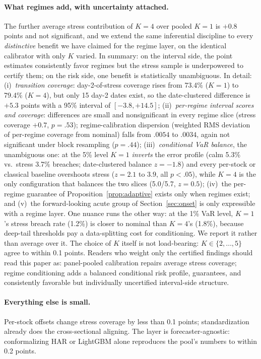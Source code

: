 \paragraph{What regimes add, with uncertainty attached.} The further
average stress contribution of $K = 4$ over pooled $K = 1$ is $+0.8$
points and not significant, and we extend the same inferential
discipline to every \emph{distinctive} benefit we have claimed for the
regime layer, on the identical calibrator with only $K$ varied. In
summary: on the interval side, the point estimates consistently
favor regimes but the stress sample is underpowered to certify them; on
the risk side, one benefit is statistically unambiguous. In detail:
(i)~\emph{transition coverage}: day-2-of-stress coverage rises from
73.4\% ($K = 1$) to 79.4\% ($K = 4$), but only 15 day-2 dates exist, so
the date-clustered difference is $+5.3$ points with a 95\% interval of
$[-3.8, +14.5]$; (ii)~\emph{per-regime interval scores and coverage}:
differences are small and nonsignificant in every regime slice
(stress coverage $+0.7$, $p = .53$); regime-calibration dispersion
(weighted RMS deviation of per-regime coverage from nominal) falls from
$.0054$ to $.0034$, again not significant under block resampling
($p = .44$); (iii)~\emph{conditional VaR balance}, the unambiguous one:
at the 5\% level $K = 1$ \emph{inverts} the error profile (calm 5.3\%
vs.\ stress 3.7\% breaches; date-clustered balance $z = -1.8$) and every
per-stock or classical baseline overshoots stress
($z = 2.1$ to $3.9$, all $p < .05$), while $K = 4$ is the only
configuration that balances the two slices (5.0/5.7, $z = 0.5$);
(iv)~the per-regime guarantee of Proposition~\ref{prop:adaptive} exists
only when regimes exist; and (v)~the forward-looking acute group of
Section~\ref{sec:onset} is only expressible with a regime layer. One
nuance runs the other way: at the 1\% VaR level, $K = 1$'s stress breach
rate (1.2\%) is closer to nominal than $K = 4$'s (1.8\%), because
deep-tail thresholds pay a data-splitting cost for conditioning. We
report it rather than average over it. The choice of $K$ itself is not
load-bearing: $K \in \{2, \dots, 5\}$ agree to within 0.1 points.
Readers who weight only the certified findings should read this paper
as: panel-pooled calibration repairs average stress coverage; regime
conditioning adds a balanced conditional risk profile, guarantees, and
consistently favorable but individually uncertified interval-side
structure.

\paragraph{Everything else is small.} Per-stock offsets change stress
coverage by less than 0.1 points; standardization already does the
cross-sectional aligning. The layer is forecaster-agnostic: conformalizing
HAR or LightGBM alone reproduces the pool's numbers to within 0.2 points.

